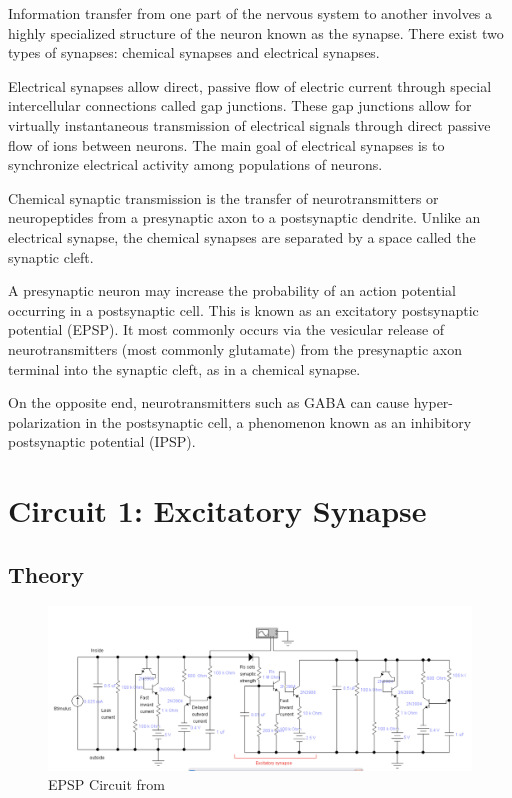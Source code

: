 \documentclass[12]{book}
\newcommand\0{\mathbf{0}}
\newcommand\<{\langle}
\renewcommand\>{\rangle}
\begin{document}
Information transfer from one part of the nervous system to another involves a highly specialized structure of the neuron known as the synapse. There exist two types of synapses: chemical synapses and electrical synapses. 

Electrical synapses allow direct, passive flow of electric current through special intercellular connections called gap junctions. These gap junctions allow for virtually instantaneous transmission of electrical signals through direct passive flow of ions between neurons. The main goal of electrical synapses is to synchronize electrical activity among populations of neurons. 

Chemical synaptic transmission is the transfer of neurotransmitters or neuropeptides from a presynaptic axon to a postsynaptic dendrite. Unlike an electrical synapse, the chemical synapses are separated by a space called the synaptic cleft.

A presynaptic neuron may increase the probability of an action potential occurring in a postsynaptic cell. This is known as an excitatory postsynaptic potential (EPSP). It most commonly occurs via the vesicular release of neurotransmitters (most commonly glutamate) from the presynaptic axon terminal into the synaptic cleft, as in a chemical synapse.

On the opposite end, neurotransmitters such as GABA can cause hyper-polarization in the postsynaptic cell, a phenomenon known as an inhibitory postsynaptic potential (IPSP).

\section{Circuit 1: Excitatory Synapse}

\subsection{Theory}

\begin{figure}[h]
\centering
\includegraphics[width=\textwidth]{excitatory_circuit}	
\caption{EPSP Circuit from \cite{levitan2015neuron}}
\label{fig:epsp}
\end{figure}
\end{document}
